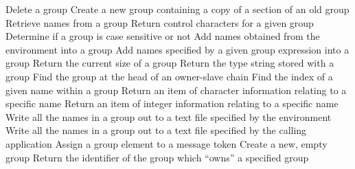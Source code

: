            {Delete a group}
            {Create a new group containing a copy of a section of an old group}
            {Retrieve names from a group}
            {Return control characters for a given group}
            {Determine if a group is case sensitive or not}
            {Add names obtained from the environment into a group}
            {Add names specified by a given group expression into a group}
            {Return the current size of a group}
            {Return the type string stored with a group}
            {Find the group at the head of an owner-slave chain}
            {Find the index of a given name within a group}
            {Return an item of character information relating to a specific name}
            {Return an item of integer information relating to a specific name}
            {Write all the names in a group out to a text file specified by the
environment}
            {Write all the names in a group out to a text file specified by the
calling application}
            {Assign a group element to a message token}
            {Create a new, empty group}
            {Return the identifier of the group which ``owns'' a specified
group}
